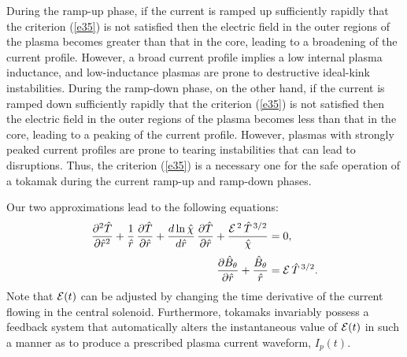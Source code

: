 \documentclass[12pt,prb,aps]{revtex4-1}
\begin{document}
During the ramp-up phase, if the current is ramped up sufficiently rapidly that the criterion (\ref{e35}) is not satisfied then the electric field in the outer regions of the plasma becomes
greater than that in the core, leading to a broadening of the current profile. However, a broad current profile implies a low internal plasma inductance,
and low-inductance plasmas are prone to destructive ideal-kink instabilities.\cite{wesson,cheng} 
During the ramp-down phase, on the other hand, if the current is ramped down sufficiently rapidly that the criterion (\ref{e35}) is not satisfied then the electric field in the outer regions of the plasma becomes
less than that in the core, leading to a peaking of the current profile. However, plasmas with strongly peaked current profiles are prone to tearing instabilities
that can lead to disruptions.\cite{wesson,cheng} Thus, the criterion (\ref{e35}) is a necessary one for  the safe operation of a tokamak during the
current ramp-up and ramp-down phases. 

Our two approximations lead to the following equations:
\begin{align}\label{e38}
\frac{\partial^2\hat{T}}{\partial \hat{r}^2} 
 +\frac{1}{\hat{r}}\,\frac{\partial\hat{T}}{\partial\hat{r}} + \frac{d\ln\hat{\chi}}{d\hat{r}}\,\frac{\partial\hat{T}}{\partial\hat{r}}
 + \frac{{\cal E}^{\,2}\,\hat{T}^{\,3/2}}{\hat{\chi}}&=0,\\[0.5ex]
 \frac{\partial\hat{B}_\theta}{\partial \hat{r}} + \frac{\hat{B}_\theta}{\hat{r}}&= {\cal E}\,\hat{T}^{\,3/2}.\label{e39}
\end{align}
Note that ${\cal E}(t)$ can be adjusted by changing the time derivative of the  current flowing in the central solenoid.  Furthermore, tokamaks
invariably  possess a feedback system that automatically alters the instantaneous value of ${\cal E}(t)$ in such a manner as to produce a prescribed plasma
current waveform, $I_p(t)$. 
\end{document}
